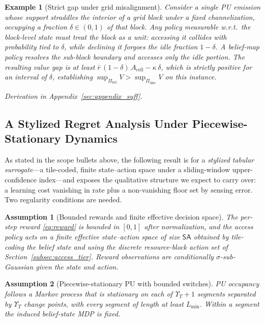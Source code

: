 \documentclass[journal]{IEEEtran}
\newtheorem{assumption}{Assumption}
\newtheorem{example}{Example}
\newcommand{\Vfun}{V}                      %
\newcommand{\bigT}{T}                      %
\newcommand{\PIbel}{\Pi_{\mathrm{bel}}}    %
\newcommand{\PIdis}{\Pi_{\mathrm{disc}}}   %
\begin{document}
\begin{example}[Strict gap under grid misalignment]
\label{ex:strictgap}
Consider a single PU emission whose support straddles the interior of a grid
block under a fixed channelization, occupying a fraction $\delta\in(0,1)$ of
that block. Any policy measurable w.r.t.\ the block-level state must treat
the block as a unit: accessing it collides with probability tied to
$\delta$, while declining it forgoes the idle fraction $1-\delta$. A
belief-map policy resolves the sub-block boundary and accesses only the idle
portion. The resulting value gap is at least
$\bar r\,(1-\delta)\,A_{\mathrm{cell}}-\kappa\,\delta$, which is strictly
positive for an interval of $\delta$, establishing
$\sup_{\PIbel}\Vfun>\sup_{\PIdis}\Vfun$ on this instance.
\end{example}
\noindent\emph{Derivation in Appendix~\ref{sec:appendix_suff}.}

\subsection{A Stylized Regret Analysis Under Piecewise-Stationary Dynamics}
\label{subsec:thmC}

As stated in the scope bullets above, the following result is for a
\emph{stylized tabular surrogate}---a tile-coded, finite state--action space
under a sliding-window upper-confidence index---and exposes the qualitative
structure we expect to carry over: a learning cost vanishing in rate plus a
non-vanishing floor set by sensing error. Two regularity conditions are needed.

\begin{assumption}[Bounded rewards and finite effective decision space]
\label{as:bounded}
The per-step reward \eqref{eq:reward} is bounded in $[0,1]$ after
normalization, and the access policy acts on a finite effective
state--action space of size $\mathsf{SA}$ obtained by tile-coding the belief
state and using the discrete resource-block action set of
Section~\ref{subsec:access_tier}. Reward observations are conditionally
$\sigma$-sub-Gaussian given the state and action.
\end{assumption}

\begin{assumption}[Piecewise-stationary PU with bounded switches]
\label{as:switch}
PU occupancy follows a Markov process that is stationary on each of
$\Upsilon_{\bigT}+1$ segments separated by $\Upsilon_{\bigT}$ change points,
with every segment of length at least $L_{\min}$. Within a segment the
induced belief-state MDP is fixed.
\end{assumption}
\end{document}
